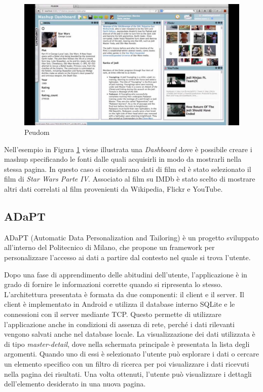 \begin{figure}[ht]
	\centering
	\includegraphics[width=\textwidth]{2-nozioni-preliminari/Immagini/peudom.jpg}
	\caption{Peudom}\label{fig:peudom}
\end{figure}

Nell'esempio in Figura \ref{fig:peudom} viene illustrata una \emph{Dashboard} dove è possibile creare i mashup specificando le fonti dalle quali acquisirli in modo da mostrarli nella stessa pagina. In questo caso si considerano dati di film ed è stato selezionato il film di \emph{Star Wars Parte IV}. Associato al film su IMDb è stato scelto di mostrare altri dati correlati al film provenienti da Wikipedia, Flickr e YouTube.

\subsection*{ADaPT}

ADaPT \cite{6816749_ADaPT} (Automatic Data Personalization and Tailoring) è un progetto sviluppato all'interno del Politecnico di Milano, che propone un framework per personalizzare l'accesso ai dati a partire dal contesto nel quale si trova l'utente. 

Dopo una fase di apprendimento delle abitudini dell'utente, l'applicazione è in grado di fornire le informazioni corrette quando si ripresenta lo stesso.
L'architettura presentata è formata da due componenti: il client e il server.
Il client è implementato in Android e utilizza il database interno SQLite e le connessioni con il server mediante TCP. Questo permette di utilizzare l'applicazione anche in condizioni di assenza di rete, perché i dati rilevanti vengono salvati anche nel database locale. La visualizzazione dei dati utilizzata è di tipo \emph{master-detail}, dove nella schermata principale è presentata la lista degli argomenti. Quando uno di essi è selezionato l'utente può esplorare i dati o cercare un elemento specifico con un filtro di ricerca per poi visualizzare i dati ricevuti nella pagina dei risultati. Una volta ottenuti, l'utente può visualizzare i dettagli dell'elemento desiderato in una nuova pagina. 

